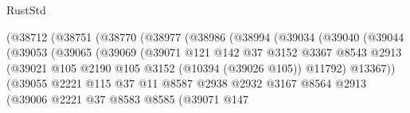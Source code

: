\begin{lexlean}{RustStd}
\begin{coremodule}
                            (@38712
                              (@38751
                                (@38770
                                  (@38977
                                    (@38986
                                      (@38994
                                        (@39034
                                          (@39040
                                            (@39044
                                              (@39053
                                                (@39065
                                                  (@39069
                                                    (@39071
                                                      @121
                                                      @142
                                                      @37
                                                      @3152
                                                      @3367
                                                      @8543
                                                      @2913
                                                      (@39021
                                                        @105
                                                        @2190
                                                        @105
                                                        @3152
                                                        (@10394 (@39026 @105))
                                                        @11792)
                                                      @13367))
                                                  (@39055
                                                    @2221
                                                    @115
                                                    @37
                                                    @11
                                                    @8587
                                                    @2938
                                                    @2932
                                                    @3167
                                                    @8564
                                                    @2913
                                                    (@39006
                                                      @2221
                                                      @37
                                                      @8583
                                                      @8585
                                                      (@39071
                                                        @147

\end{coremodule}
\end{lexlean}
